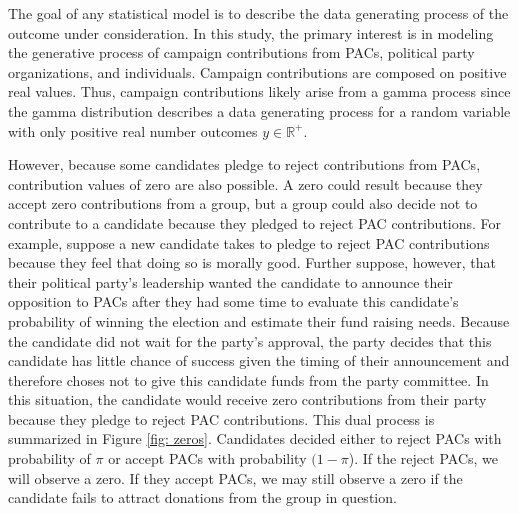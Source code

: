 \documentclass[12pt]{article}
\begin{document}
The goal of any statistical model is to describe the data generating process of the outcome under consideration. In this study, the primary interest is in modeling the generative process of campaign contributions from PACs, political party organizations, and individuals. Campaign contributions are composed on positive real values. Thus, campaign contributions likely arise from a gamma process since the gamma distribution describes a data generating process for a random variable with only positive real number outcomes $y \in  \mathbb{R}^+$. 

However, because some candidates pledge to reject contributions from PACs, contribution values of zero are also possible. A zero could result because they accept zero contributions from a group, but a group could also decide not to contribute to a candidate because they pledged to reject PAC contributions. For example, suppose a new candidate takes to pledge to reject PAC contributions because they feel that doing so is morally good. Further suppose, however, that their political party's leadership wanted the candidate to announce their opposition to PACs after they had some time to evaluate this candidate's probability of winning the election and estimate their fund raising needs. Because the candidate did not wait for the party's approval, the party decides that this candidate has little chance of success given the timing of their announcement and therefore choses not to give this candidate funds from the party committee. In this situation, the candidate would receive zero contributions from their party because they pledge to reject PAC contributions. This dual process is summarized in Figure \ref{fig: zeros}. Candidates decided either to reject PACs with probability of $\pi$ or accept PACs with probability $(1 - \pi$). If the reject PACs, we will observe a zero. If they accept PACs, we may still observe a zero if the candidate fails to attract donations from the group in question. 
\end{document}
